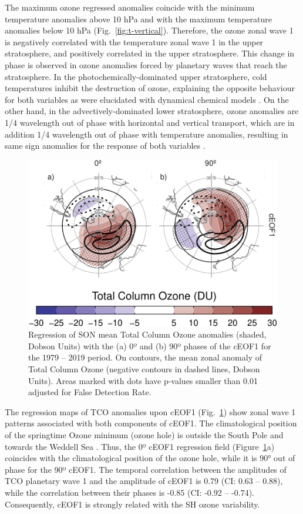 \documentclass[pdflatex,lineno,sn-basic]{sn-jnl}
\theoremstyle{thmstyleone}%
\theoremstyle{thmstyletwo}%
\theoremstyle{thmstylethree}%
\begin{document}
The maximum ozone regressed anomalies coincide with the minimum temperature anomalies above 10 hPa and with the maximum temperature anomalies below 10 hPa (Fig.~\ref{fig:t-vertical}).
Therefore, the ozone zonal wave 1 is negatively correlated with the temperature zonal wave 1 in the upper stratosphere, and positively correlated in the upper stratosphere.
This change in phase is observed in ozone anomalies forced by planetary waves that reach the stratosphere.
In the photochemically-dominated upper stratosphere, cold temperatures inhibit the destruction of ozone, explaining the opposite behaviour for both variables as were elucidated with dynamical chemical models \citep{hartmann1979, wirth1993, smith1995}.
On the other hand, in the advectively-dominated lower stratosphere, ozone anomalies are 1/4 wavelength out of phase with horizontal and vertical transport, which are in addition 1/4 wavelength out of phase with temperature anomalies, resulting in same sign anomalies for the response of both variables \citep{hartmann1979, wirth1993, smith1995}.



\begin{figure}
\centering
\includegraphics{shceof_files/figure-latex/o3-regr-1.pdf}
\caption{\label{fig:o3-regr}Regression of SON mean Total Column Ozone anomalies (shaded, Dobson Units) with the (a) 0º and (b) 90º phases of the cEOF1 for the 1979 -- 2019 period. On contours, the mean zonal anomaly of Total Column Ozone (negative contours in dashed lines, Dobson Units). Areas marked with dots have p-values smaller than 0.01 adjusted for False Detection Rate.}
\end{figure}



The regression maps of TCO anomalies upon cEOF1 (Fig.~\ref{fig:o3-regr}) show zonal wave 1 patterns associated with both components of cEOF1.
The climatological position of the springtime Ozone minimum (ozone hole) is outside the South Pole and towards the Weddell Sea \citep[e.g.][]{grytsai2011}.
Thus, the 0º cEOF1 regression field (Figure~\ref{fig:o3-regr}a) coincides with the climatological position of the ozone hole, while it is 90° out of phase for the 90º cEOF1.
The temporal correlation between the amplitudes of TCO planetary wave 1 and the amplitude of cEOF1 is 0.79 (CI: 0.63 -- 0.88), while the correlation between their phases is -0.85 (CI: -0.92 -- -0.74).
Consequently, cEOF1 is strongly related with the SH ozone variability.
\end{document}
